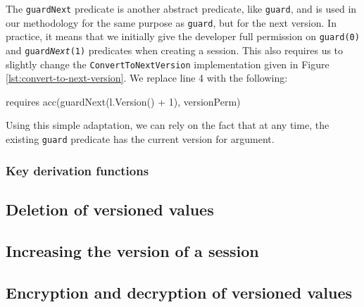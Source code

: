The \texttt{guardNext} predicate is another abstract predicate, like \texttt{guard}, and is used in our methodology for the same purpose as \texttt{guard}, but for the next version. 
In practice, it means that we initially give the developer full permission on \texttt{guard(0)} and \texttt{guard\emph{Next}(1)} predicates when creating a session.
This also requires us to slightly change the \texttt{ConvertToNextVersion} implementation given in Figure \ref{lst:convert-to-next-version}.
We replace line 4 with the following:
\begin{gobra}
requires acc(guardNext(l.Version() + 1), versionPerm)
\end{gobra}

Using this simple adaptation, we can rely on the fact that at any time, the existing \texttt{guard} predicate has the current version for argument.

\subsubsection{Key derivation functions} %

\subsection{Deletion of versioned values}



\subsection{Increasing the version of a session}

\subsection{Encryption and decryption of versioned values}

